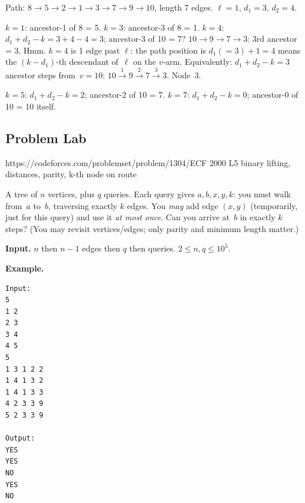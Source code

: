 \begin{tracebox}[Route positions on T: u=8, v=10]
Path: \(8 \to 5 \to 2 \to 1 \to 3 \to 7 \to 9 \to 10\), length 7 edges.
\(\ell = 1\), \(d_1 = 3\), \(d_2 = 4\).

\(k=1\): ancestor-1 of 8 = 5.  \checkmark
\(k=3\): ancestor-3 of 8 = 1.  \checkmark
\(k=4\): \(d_1+ d_2 - k = 3+4-4 = 3\); ancestor-3 of 10 = 7?
\(10\to9\to7\to3\): 3rd ancestor = 3.  Hmm.
\(k=4\) is 1 edge past \(\ell\): the path position is \(d_1(=3) + 1 = 4\)
means the \((k-d_1)\)-th descendant of~\(\ell\) on the \(v\)-arm.
Equivalently: \(d_1+d_2 - k = 3\) ancestor steps from~\(v=10\):
\(10 \xrightarrow{1} 9 \xrightarrow{2} 7 \xrightarrow{3} 3\).  Node~3.  \checkmark

\(k=5\): \(d_1+d_2-k = 2\); ancestor-2 of 10 = 7.  \checkmark
\(k=7\): \(d_1+d_2-k = 0\); ancestor-0 of 10 = 10 itself.  \checkmark
\end{tracebox}

\subsection{Problem Lab}

  {https://codeforces.com/problemset/problem/1304/E}{CF 2000 L5}
  {binary lifting, distances, parity, k-th node on route}

\begin{problemstatement}
A tree of \(n\) vertices, plus \(q\) queries.  Each query gives \(a, b, x,
y, k\): you must walk from~\(a\) to~\(b\), traversing exactly \(k\) edges.
You \emph{may} add edge \((x,y)\) (temporarily, just for this query) and
use it \emph{at most once}.  Can you arrive at~\(b\) in exactly \(k\) steps?
(You may revisit vertices/edges; only parity and minimum length matter.)

\textbf{Input.} \(n\) then \(n\!-\!1\) edges then \(q\) then queries.
\(2\le n,q\le 10^5\).

\textbf{Example.}
\begin{verbatim}
Input:
5
1 2
2 3
3 4
4 5
5
1 3 1 2 2
1 4 1 3 2
1 4 1 3 3
4 2 3 3 9
5 2 3 3 9

Output:
YES
YES
NO
YES
NO
\end{verbatim}
\end{problemstatement}

\begin{attemptgate}
\end{attemptgate}


